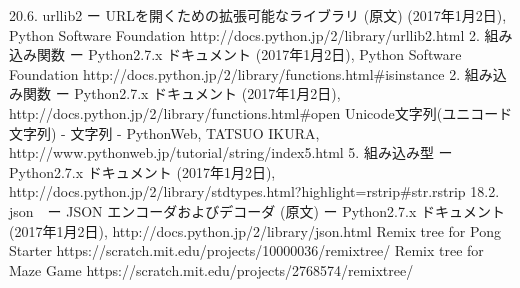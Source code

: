 \documentclass[a4paper,10pt,onecolumn,oneside,openany]{jsbook}
\begin{document}
\begin{thebibliography}{30}
 20.6. urllib2 ー URLを開くための拡張可能なライブラリ (原文) (2017年1月2日), Python Software Foundation http://docs.python.jp/2/library/urllib2.html
 2. 組み込み関数 ー Python2.7.x ドキュメント (2017年1月2日), Python Software Foundation http://docs.python.jp/2/library/functions.html\#isinstance
 2. 組み込み関数 ー Python2.7.x ドキュメント (2017年1月2日), http://docs.python.jp/2/library/functions.html\#open
 Unicode文字列(ユニコード文字列) - 文字列 - PythonWeb, TATSUO IKURA, http://www.pythonweb.jp/tutorial/string/index5.html
 5. 組み込み型 ー Python2.7.x ドキュメント (2017年1月2日), http://docs.python.jp/2/library/stdtypes.html?highlight=rstrip\#str.rstrip
 18.2. json　ー JSON エンコーダおよびデコーダ (原文) ー Python2.7.x ドキュメント (2017年1月2日), http://docs.python.jp/2/library/json.html
Remix tree for Pong Starter https://scratch.mit.edu/projects/10000036/remixtree/
Remix tree for Maze Game https://scratch.mit.edu/projects/2768574/remixtree/




\end{thebibliography}

\newpage
\appendix
\chapter{}




\newpage



\newpage
\printindex
%
%
\end{document}
